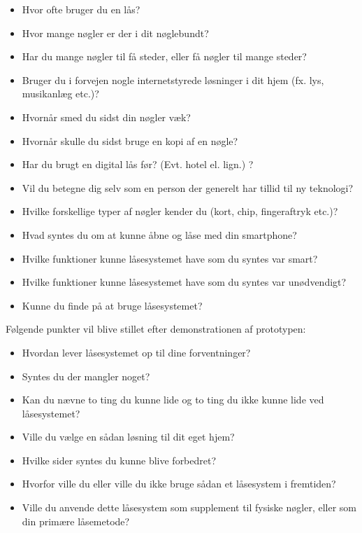 \documentclass[a4paper,12pt]{article}
\begin{document}
\begin{itemize}
    \item Hvor ofte bruger du en lås?
    \item Hvor mange nøgler er der i dit nøglebundt?
    \item Har du mange nøgler til få steder, eller få nøgler til mange steder?
    \item Bruger du i forvejen nogle internetstyrede løsninger i dit hjem (fx. lys, musikanlæg etc.)?
    \item Hvornår smed du sidst din nøgler væk?
    \item Hvornår skulle du sidst bruge en kopi af en nøgle?
    \item Har du brugt en digital lås før? (Evt. hotel el. lign.) ?
    \item Vil du betegne dig selv som en person der generelt har tillid til ny teknologi?
    \item Hvilke forskellige typer af nøgler kender du (kort, chip, fingeraftryk etc.)?
    \item Hvad syntes du om at kunne åbne og låse med din smartphone?
    \item Hvilke funktioner kunne låsesystemet have som du syntes var smart?
    \item Hvilke funktioner kunne låsesystemet have som du syntes var unødvendigt?
    \item Kunne du finde på at bruge låsesystemet?
\end{itemize}
Følgende punkter vil blive stillet efter demonstrationen af prototypen:

\begin{itemize}
    \item Hvordan lever låsesystemet op til dine forventninger?
    \item Syntes du der mangler noget?
    \item Kan du nævne to ting du kunne lide og to ting du ikke kunne lide ved låsesystemet?
    \item Ville du vælge en sådan løsning til dit eget hjem?
    \item Hvilke sider syntes du kunne blive forbedret?
    \item Hvorfor ville du eller ville du ikke bruge sådan et låsesystem i fremtiden?
    \item Ville du anvende dette låsesystem som supplement til fysiske nøgler, eller som din primære låsemetode?
\end{itemize}
\end{document}

